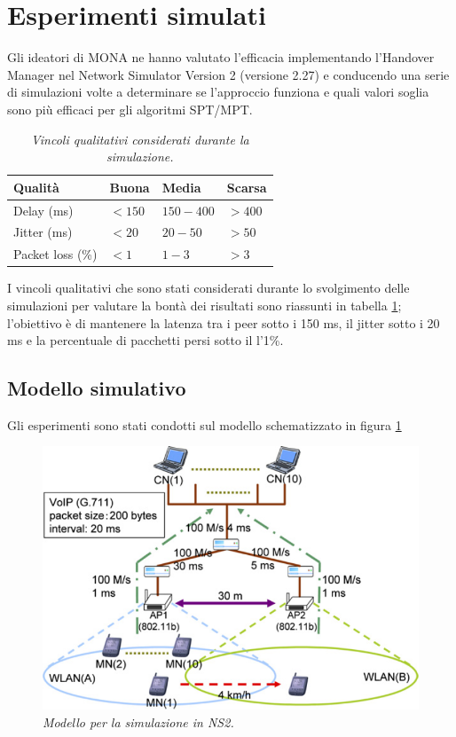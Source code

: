 \documentclass[12pt,a4paper,openright,twoside]{book}
\begin{document}
\section{Esperimenti simulati}

Gli ideatori di MONA ne hanno valutato l'efficacia implementando
l'Handover Manager nel Network Simulator Version 2 \cite{bib:ns-2}
(versione 2.27) e conducendo una serie di simulazioni volte a
determinare se l'approccio funziona e quali valori soglia sono più
efficaci per gli algoritmi SPT/MPT.

\begin{table}
  \centering
  \begin{tabular}[bt]{|llll|}
    \hline
    Qualità & Buona & Media & Scarsa          \\
    \hline
    Delay (ms) & $<150$ & $150-400$ & $>400$ \\
    Jitter (ms) & $<20$ & $20-50$ & $>50$    \\
    Packet loss (\%) & $<1$ & $1-3$ & $>3$   \\
    \hline
  \end{tabular}
  \caption{\em Vincoli qualitativi considerati durante la simulazione.}
  \label{tab:mona:vincoli}
\end{table}

I vincoli qualitativi che sono stati considerati durante lo
svolgimento delle simulazioni per valutare la bontà dei risultati sono
riassunti in tabella \ref{tab:mona:vincoli}; l'obiettivo è di
mantenere la latenza tra i peer sotto i 150 ms, il jitter sotto i 20
ms e la percentuale di pacchetti persi sotto il l'1\%.

\subsection{Modello simulativo}

Gli esperimenti sono stati condotti sul modello schematizzato in
figura \ref{fig:mona:qos-sim-model}

\begin{figure}[tb]
  \centering
  \includegraphics[width=\textwidth]{img/mona-qos-sim-model}
  \caption{\em Modello per la simulazione in NS2.}
  \label{fig:mona:qos-sim-model}
\end{figure}
\end{document}
